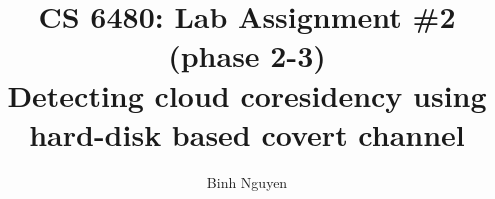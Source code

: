\documentclass[letterpaper,twocolumn,10pt]{article}
\title{CS 6480: Lab Assignment \#2 (phase 2-3)\\
Detecting cloud coresidency using hard-disk based covert channel}
\author[1]{Binh Nguyen}
\affil[1]{School of Computing, University of Utah}
\begin{document}
\maketitle



{
  \small 
  
  
}
\end{document}
